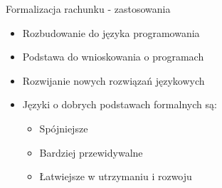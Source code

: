 \documentclass{beamer}
\begin{document}
\begin{frame}{Formalizacja rachunku - zastosowania}
  \begin{itemize}
    \item Rozbudowanie do języka programowania
    \item Podstawa do wnioskowania o programach
    \item Rozwijanie nowych rozwiązań językowych
    \item Języki o dobrych podstawach formalnych są:
    \begin{itemize}
      \item Spójniejsze
      \item Bardziej przewidywalne
      \item Łatwiejsze w utrzymaniu i rozwoju
    \end{itemize}
  \end{itemize}
\end{frame}


\end{document}
